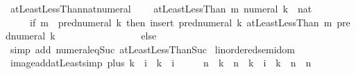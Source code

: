 \begin{isabellebody}
\endisatagproof
{\isafoldproof}%
%
\isadelimproof
\isanewline
%
\endisadelimproof
\isanewline
{}\isamarkupfalse%
\ atLeastLessThan{\isacharunderscore}{\kern0pt}nat{\isacharunderscore}{\kern0pt}numeral{\isacharcolon}{\kern0pt}\ \ %
\isanewline
\ \ {\isachardoublequoteopen}atLeastLessThan\ m\ {\isacharparenleft}{\kern0pt}numeral\ k\ {\isacharcolon}{\kern0pt}{\isacharcolon}{\kern0pt}\ nat{\isacharparenright}{\kern0pt}\ {\isacharequal}{\kern0pt}\isanewline
\ \ \ \ \ {\isacharparenleft}{\kern0pt}if\ m\ {\isasymle}\ {\isacharparenleft}{\kern0pt}pred{\isacharunderscore}{\kern0pt}numeral\ k{\isacharparenright}{\kern0pt}\ then\ insert\ {\isacharparenleft}{\kern0pt}pred{\isacharunderscore}{\kern0pt}numeral\ k{\isacharparenright}{\kern0pt}\ {\isacharparenleft}{\kern0pt}atLeastLessThan\ m\ {\isacharparenleft}{\kern0pt}pred{\isacharunderscore}{\kern0pt}numeral\ k{\isacharparenright}{\kern0pt}{\isacharparenright}{\kern0pt}\isanewline
\ \ \ \ \ \ \ \ \ \ \ \ \ \ \ \ \ else\ {\isacharbraceleft}{\kern0pt}{\isacharbraceright}{\kern0pt}{\isacharparenright}{\kern0pt}{\isachardoublequoteclose}\isanewline
%
\isadelimproof
\ \ %
\endisadelimproof
%
\isatagproof
{}\isamarkupfalse%
\ {\isacharparenleft}{\kern0pt}simp\ add{\isacharcolon}{\kern0pt}\ numeral{\isacharunderscore}{\kern0pt}eq{\isacharunderscore}{\kern0pt}Suc\ atLeastLessThanSuc{\isacharparenright}{\kern0pt}%
\endisatagproof
{\isafoldproof}%
%
\isadelimproof
%
\endisadelimproof
%
\isadelimdocument
%
\endisadelimdocument
%
\isatagdocument
%
\isamarkuptrue%
%
\endisatagdocument
{\isafolddocument}%
%
\isadelimdocument
%
\endisadelimdocument
{}\isamarkupfalse%
\ linordered{\isacharunderscore}{\kern0pt}semidom\isanewline
{}\isanewline
\isanewline
{}\isamarkupfalse%
\ image{\isacharunderscore}{\kern0pt}add{\isacharunderscore}{\kern0pt}atLeast{\isacharbrackleft}{\kern0pt}simp{\isacharbrackright}{\kern0pt}{\isacharcolon}{\kern0pt}\ {\isachardoublequoteopen}plus\ k\ {\isacharbackquote}{\kern0pt}\ {\isacharbraceleft}{\kern0pt}i{\isachardot}{\kern0pt}{\isachardot}{\kern0pt}{\isacharbraceright}{\kern0pt}\ {\isacharequal}{\kern0pt}\ {\isacharbraceleft}{\kern0pt}k\ {\isacharplus}{\kern0pt}\ i{\isachardot}{\kern0pt}{\isachardot}{\kern0pt}{\isacharbraceright}{\kern0pt}{\isachardoublequoteclose}\isanewline
%
\isadelimproof
%
\endisadelimproof
%
\isatagproof
{}\isamarkupfalse%
\ {\isacharminus}{\kern0pt}\isanewline
\ \ \isamarkupfalse%
\ {\isachardoublequoteopen}n\ {\isacharequal}{\kern0pt}\ k\ {\isacharplus}{\kern0pt}\ {\isacharparenleft}{\kern0pt}n\ {\isacharminus}{\kern0pt}\ k{\isacharparenright}{\kern0pt}{\isachardoublequoteclose}\ \ {\isachardoublequoteopen}i\ {\isacharplus}{\kern0pt}\ k\ {\isasymle}\ n{\isachardoublequoteclose}\ \ n\isanewline

\end{isabellebody}
